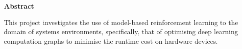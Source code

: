 \newpage
{\Huge \bf Abstract}
\vspace{24pt} 

This project investigates the use of model-based reinforcement learning to the domain of systems environments, specifically, that of optimising deep learning computation graphs to minimise the runtime cost on hardware devices.

\vspace*{\fill}
